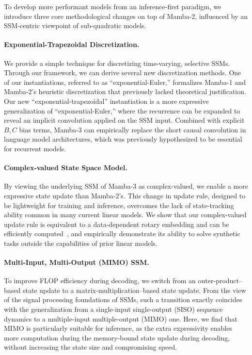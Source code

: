 To develop more performant models from an inference-first paradigm, we introduce three core methodological changes on top of Mamba-2, influenced by an SSM-centric viewpoint of sub-quadratic models.

\paragraph{Exponential-Trapezoidal Discretization.} 
We provide a simple technique for discretizing time-varying, selective SSMs.
Through our framework, we can derive several new discretization methods.
One of our instantiations, referred to as ``exponential-Euler,'' formalizes Mamba-1 and Mamba-2's heuristic discretization that previously lacked theoretical justification.
Our new ``exponential-trapezoidal'' instantiation is a more expressive generalization of ``exponential-Euler,'' where the recurrence can be expanded to reveal an implicit convolution applied on the SSM input. 
Combined with explicit $B,C$ bias terms,
Mamba-3 can empirically replace the short causal convolution in language model architectures, which was previously hypothesized to be essential for recurrent models.

\paragraph{Complex-valued State Space Model.} By viewing the underlying SSM of Mamba-3 as complex-valued, we enable a more expressive state update than Mamba-2's. This change in update rule, designed to be lightweight for training and inference, overcomes the lack of state-tracking ability common in many current linear models. We show that our complex-valued update rule is equivalent to a data-dependent rotary embedding and can be efficiently computed~\citep{su2023roformerenhancedtransformerrotary}, and empirically demonstrate its ability to solve synthetic tasks outside the capabilities of prior linear models.

\paragraph{Multi-Input, Multi-Output (MIMO) SSM.} To improve FLOP efficiency during decoding, we switch from an outer-product–based state update to a matrix-multiplication–based state update.
From the view of the signal processing foundations of SSMs, such a transition exactly coincides with the generalization from a single-input single-output (SISO) sequence dynamics to a multiple-input multiple-output (MIMO) one. Here, we find that MIMO is particularly suitable for inference, as the extra expressivity enables more computation during the memory-bound state update during decoding, without increasing the state size and compromising speed.

